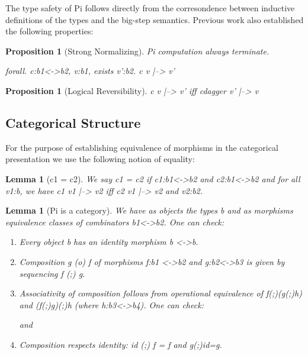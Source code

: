 \documentclass[preprint]{sigplanconf}
\newtheorem{lemma}[theorem]{Lemma}
\newtheorem{proposition}[theorem]{Proposition}
\begin{document}
The type safety of {{Pi}} follows directly from the corresondence
between inductive definitions of the types and the big-step
semantics. Previous work also established the following properties:

\begin{proposition}[Strong Normalizing]
\label{prop:termination-pi} 
{{Pi}} computation always terminate.  

{{forall. c:b1<->b2, v:b1, exists v':b2.}}  
{{c v |--> v'}}
\end{proposition}

\begin{proposition}[Logical Reversibility]
\label{prop:logrev}
{{c v |--> v'}} iff 
{{ c{dagger} v' |--> v}}
\end{proposition}

\subsection{Categorical Structure}

For the purpose of establishing equivalence of morphisms in the
categorical presentation we use the following notion of equality:

\begin{lemma}[{{c1  = c2}}]
We say {{c1 = c2}} if {{c1:b1<->b2}} and {{c2:b1<->b2}} and for all
{{v1:b}}, we have {{c1 v1 |--> v2}} iff {{c2 v1 |--> v2}} and {{v2:b2}}.
\end{lemma}

\begin{lemma}[{{Pi}} is a category]
  We have as objects the types {{b}} and as morphisms equivalence
  classes of combinators {{b1<->b2}}. One can check:
  \begin{enumerate}
  \item Every object {{b}} has an identity morphism {{b <->b}}.
  \item Composition {{g (o) f}} of morphisms {{f:b1 <->b2}} and
    {{g:b2<->b3}} is given by sequencing {{f (;) g}}. 
  \item Associativity of composition follows from operational
    equivalence of {{f(;)(g(;)h)}} and {{(f(;)g)(;)h}} (where
    {{h:b3<->b4}}). One can check:


and


  \item Composition respects identity: {{id (;) f = f}} and {{g(;)id=g}}.
  \end{enumerate}
\end{lemma}
\end{document}

